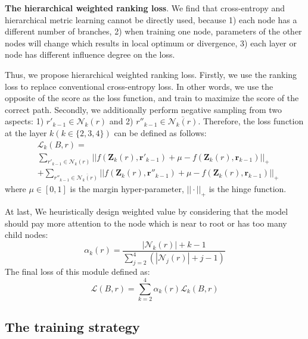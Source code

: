 \documentclass{article}
\begin{document}
\textbf{The hierarchical weighted ranking loss}. We find that cross-entropy and hierarchical metric learning \cite{verma2012learning} cannot be directly used, because 1) each node has a different number of branches, 2) when training one node, parameters of the other nodes will change which results in local optimum or divergence, 3) each layer or node has different influence degree on the loss.

Thus, we propose hierarchical weighted ranking loss. Firstly, we use the ranking loss to replace conventional cross-entropy loss. In other words, we use the opposite of the score as the loss function, and train to maximize the score of the correct path. Secondly, we additionally perform negative sampling from two aspects: 1) $r'_{k-1}\in\mathcal{N}_k(r)$ and 2) $r''_{k-1}\in\overline{\mathcal{N}_k(r)}$. Therefore, the loss function at the layer $k(k\in\{2,3,4\})$ can be defined as follows:
\begin{equation}
\begin{aligned}
& \mathcal{L}_k(B, r) = \\
& \sum_{r'_{k-1}\in\mathcal{N}_k(r)}||f(\mathbf{Z}_k(r), \mathbf{r'}_{k-1})
+ \mu - f(\mathbf{Z}_k(r), \mathbf{r}_{k-1})||_{+}\\
& + \sum_{r''_{k-1}\in\overline{\mathcal{N}_k(r)}}||f(\mathbf{Z}_k(r), \mathbf{r''}_{k-1})
+ \mu - f(\mathbf{Z}_k(r), \mathbf{r}_{k-1})||_{+}
\label{eq13}
\end{aligned}
\end{equation}
where $\mu\in[0,1]$ is the margin hyper-parameter, $||\cdot||_{+}$ is the hinge function. 

At last, We heuristically design weighted value by considering that the model should pay more attention to the node which is near to root or has too many child nodes:
\begin{equation}
\alpha_k(r) = \frac{|\mathcal{N}_k(r)|+k-1}{\sum_{j=2}^{4}(|\mathcal{N}_j(r)|+j-1)}
\label{eq14}
\end{equation}
The final loss of this module defined as:
\begin{equation}
\mathcal{L}(B, r) = \sum_{k=2}^{4}\alpha_k(r)\mathcal{L}_k(B,r)
\label{eq15}
\end{equation}






\subsection{The training strategy}
\end{document}
